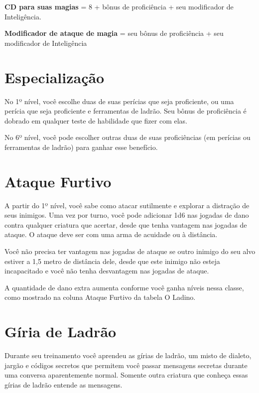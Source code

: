 \documentclass{RPG_Adventure}[2021/10/20]
\begin{document}
\begin{center}
\textbf{CD para suas magias} = 8 + bônus de proficiência + seu modificador de
Inteligência. \nl

\textbf{Modificador de ataque de magia} = seu bônus de proficiência + seu
modificador de Inteligência
\end{center}

\section*{Especialização}%

No 1º nível, você escolhe duas de suas perícias que seja proficiente, ou uma
perícia que seja proficiente e ferramentas de ladrão. Seu bônus de proficiência
é dobrado em qualquer teste de habilidade que fizer com elas.

No 6º nível, você pode escolher outras duas de suas proficiências (em perícias
ou ferramentas de ladrão) para ganhar esse benefício.

\section*{Ataque Furtivo}%

A partir do 1º nível, você sabe como atacar sutilmente e explorar a distração de
seus inimigos. Uma vez por turno, você pode adicionar 1d6 nas jogadas de dano
contra qualquer criatura que acertar, desde que tenha vantagem nas jogadas de
ataque. O ataque deve ser com uma arma de acuidade ou à distância.

Você não precisa ter vantagem nas jogadas de ataque se outro inimigo do seu alvo
estiver a 1,5 metro de distância dele, desde que este inimigo não esteja
incapacitado e você não tenha desvantagem nas jogadas de ataque.

A quantidade de dano extra aumenta conforme você ganha níveis nessa classe, como
mostrado na coluna Ataque Furtivo da tabela O Ladino.

\section*{Gíria de Ladrão}%

Durante seu treinamento você aprendeu as gírias de ladrão, um misto de dialeto,
jargão e códigos secretos que permitem você passar mensagens secretas durante
uma conversa aparentemente normal. Somente outra criatura que conheça essas
gírias de ladrão entende as mensagens.
\end{document}
